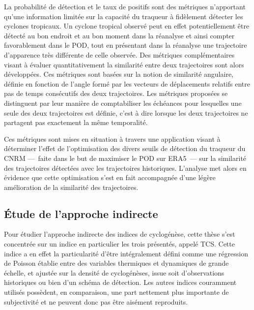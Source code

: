 \documentclass[../main.tex]{subfiles}
\begin{document}
La probabilité de détection et le taux de positifs sont des métriques n'apportant qu'une information limitée sur la capacité du traqueur à fidèlement détecter
les cyclones tropicaux. Un cyclone tropical observé peut en effet potentiellement être détecté au bon endroit et au bon moment dans la réanalyse et ainsi
compter favorablement dans le POD, tout en présentant dans la réanalyse une trajectoire d'apparence très différente de celle observée. Des métriques
complémentaires visant à évaluer quantitativement la similarité entre deux trajectoires sont alors développées. Ces métriques sont basées sur la notion de
similarité angulaire, définie en fonction de l'angle formé par les vecteurs de déplacements relatifs entre pas de temps consécutifs des deux trajectoires. Les
métriques proposées se distinguent par leur manière de comptabiliser les échéances pour lesquelles une seule des deux trajectoires est définie, c'est à dire
lorsque les deux trajectoires ne partagent pas exactement la même temporalité. 

Ces métriques sont mises en situation à travers une application visant à déterminer l'effet de l'optimisation des divers seuils de détection du traqueur du CNRM
---~faite dans le but de maximiser le POD sur ERA5~--- sur la similarité des trajectoires détectées avec les trajectoires historiques. L'analyse met alors en
évidence que cette optimisation s'est en fait accompagnée d'une légère amélioration de la similarité des trajectoires.

\subsection*{Étude de l'approche indirecte}

Pour étudier l'approche indirecte des indices de cyclogénèse, cette thèse s'est concentrée sur un indice en particulier les trois présentés, appelé TCS. Cette
indice a en effet la particularité d'être intégralement défini comme une régression de Poisson établie entre des variables thermiques et dynamiques de grande
échelle, et ajustée sur la densité de cyclogénèses, issue soit d'observations historiques ou bien d'un schéma de détection. Les autres indices couramment
utilisés possèdent, en comparaison, une part nettement plus importante de subjectivité et ne peuvent donc pas être aisément reproduits.
\end{document}
